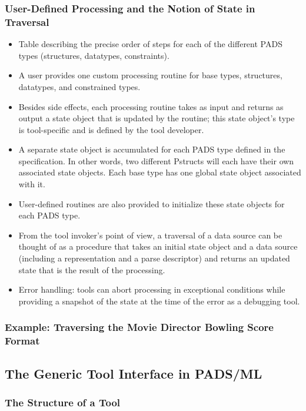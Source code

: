 \subsubsection{User-Defined Processing and the Notion of State in Traversal}
\label{sec:gen-tool-traversal-state}
\begin{itemize}
\item Table describing the precise order of steps for each of the different PADS types (structures, datatypes, constraints).
\item A user provides one custom processing routine for base types, structures, datatypes, and constrained types.
\item Besides side effects, each processing routine takes as input and returns as output a state object that is updated by the routine; this state object's type is tool-specific and is defined by the tool developer.
\item A separate state object is accumulated for each PADS type defined in the specification. In other words, two different Pstructs will each have their own associated state objects. Each base type has one global state object associated with it.
\item User-defined routines are also provided to initialize these state objects for each PADS type.
\item From the tool invoker's point of view, a traversal of a data source can be thought of as a procedure that takes an initial state object and a data source (including a representation and a parse descriptor) and returns an updated state that is the result of the processing.
\item Error handling: tools can abort processing in exceptional conditions while providing a snapshot of the state at the time of the error as a debugging tool.
\end{itemize}

\subsubsection{Example: Traversing the Movie Director Bowling Score Format}
\label{sec:gen-tool-traversal-mbs}

\subsection{The Generic Tool Interface in PADS/ML}
\label{sec:gen-tool-interface}

\subsubsection{The Structure of a Tool}
\label{sec:gen-tool-interface-tool-struct}

